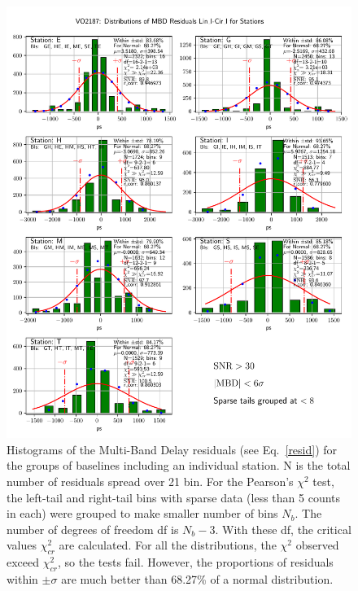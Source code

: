\documentclass[letterpaper,twoside,12pt]{article}
\begin{document}
\begin{figure}[ht!]
  \begin{center}
  \includegraphics[width=33pc]{VO2187_Distr_MBD_Lin_I-Cir_I_Diff_Stations.pdf}
  \caption{\small Histograms of the Multi-Band Delay residuals (see Eq.~\eqref{resid}) for the groups of baselines including an individual station. N is the total number of residuals spread over 21 bin. For the Pearson's $\chi^2$ test, the left-tail and right-tail bins with sparse data (less than 5 counts in each) were grouped to make smaller number of bins $N_b$. The number of degrees of freedom df is $N_b-3$. With these df, the critical values $\chi^2_{cr}$ are calculated. For all the distributions, the $\chi^2$ observed exceed $\chi^2_{cr}$, so the tests fail. However, the proportions of residuals within $\pm\sigma$ are much better than 68.27\% of a normal distribution.}
  \label{dmbd_distr_st}
  \end{center}
\end{figure}
\end{document}
